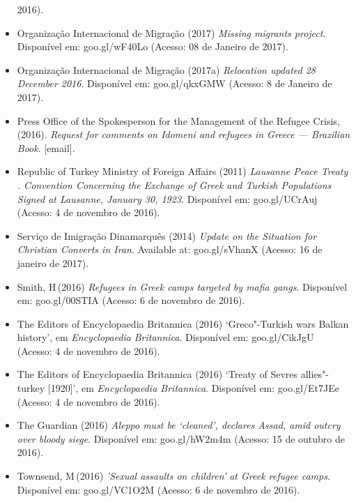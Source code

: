 \begin{itemize}
  2016).
\item
  Organização Internacional de Migração (2017) \emph{Missing migrants
  project}. Disponível em: goo.gl/wF40Lo (Acesso: 08 de Janeiro de
  2017).
\item
  Organização Internacional de Migração (2017a) \emph{Relocation updated
  28 December 2016}. Disponível em: goo.gl/qkx{GMW} (Acesso: 8 de Janeiro
  de 2017).
\item
  Press Office of the Spokesperson for the Management of the Refugee
  Crisis, (2016). \emph{Request for comments on Idomeni and refugees in
  Greece --- Brazilian Book}. {[}email{]}.
\item
  Republic of Turkey Ministry of Foreign Affairs (2011) \emph{Lausanne
  Peace Treaty . Convention Concerning the Exchange of Greek and
  Turkish Populations Signed at Lausanne, January 30, 1923}. Disponível
  em: goo.gl/{UC}rAuj (Acesso: 4 de novembro de 2016).
\item
  Serviço de Imigração Dinamarquês (2014) \emph{Update on the Situation
  for Christian Converts in Iran}. Available at: goo.gl/sVhanX (Acesso:
  16 de janeiro de 2017).
\item
  Smith, H\,(2016) \emph{Refugees in Greek camps targeted by mafia
  gangs}. Disponível em: goo.gl/00{STIA} (Acesso: 6 de novembro de 2016).
\item
  The Editors of Encyclopaedia Britannica (2016) `Greco"-Turkish wars
  \textbar{} Balkan history', em \emph{Encyclopaedia} \emph{Britannica}.
  Disponível em: goo.gl/CikJgU (Acesso: 4 de novembro de 2016).
\item
  The Editors of Encyclopaedia Britannica (2016) `Treaty of Sevres
  \textbar{} allies"-turkey {[}1920{]}', em \emph{Encyclopaedia
  Britannica}. Disponível em: goo.gl/Et7{JE}e (Acesso: 4 de novembro de
  2016).
\item
  The Guardian (2016) \emph{Aleppo must be}
  \emph{`}\emph{cleaned}\emph{'}\emph{, declares Assad, amid outcry over
  bloody siege}. Disponível em: goo.gl/hW2m4m (Acesso: 15 de outubro de
  2016).
\item
  Townsend, M\,(2016) \emph{'}\emph{Sexual assaults on children}\emph{'}
  \emph{at Greek refugee camps}. Disponível em: goo.gl/{VC}1O2M (Acesso: 6
  de novembro de 2016).
\end{itemize}
\endgroup